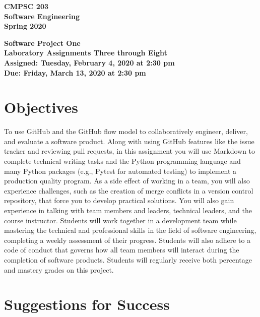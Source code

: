 \documentclass[11pt]{article}
\newcommand{\assignmentduedate}{March 13}
\newcommand{\assignmentassignedate}{February 4}
\newcommand{\assignmentnumber}{One}
\newcommand{\labassignmentnumberstart}{Three}
\newcommand{\labassignmentnumberend}{Eight}
\newcommand{\labyear}{2020}
\newcommand{\labdueday}{Friday}
\newcommand{\labassignday}{Tuesday}
\newcommand{\labtime}{2:30 pm}
\newcommand{\assigneddate}{Assigned: \labassignday, \assignmentassignedate, \labyear{} at \labtime{}}
\newcommand{\duedate}{Due: \labdueday, \assignmentduedate, \labyear{} at \labtime{}}
\newcommand{\labtitle}[1]
{
  \begin{center}
    \begin{center}
      \bf
      CMPSC 203\\Software Engineering\\
      Spring 2020\\
      \medskip
    \end{center}
    \bf
    #1
  \end{center}
}
\begin{document}
\thispagestyle{empty}

\labtitle{Software Project \assignmentnumber{} \\ Laboratory Assignments \labassignmentnumberstart{} through \labassignmentnumberend{} \\ \assigneddate{} \\ \duedate{}}

\section*{Objectives}

To use GitHub and the GitHub flow model to collaboratively engineer, deliver,
and evaluate a software product.
%
Along with using GitHub features like the issue tracker and reviewing pull
requests, in this assignment you will use Markdown to complete technical writing
tasks and the Python programming language and many Python packages (e.g., Pytest
for automated testing) to implement a production quality program.
%
As a side effect of working in a team, you will also experience challenges, such
as the creation of merge conflicts in a version control repository, that force
you to develop practical solutions.
%
You will also gain experience in talking with team members and leaders,
technical leaders, and the course instructor.
%
Students will work together in a development team while mastering the technical
and professional skills in the field of software engineering, completing a
weekly assessment of their progress.
%
Students will also adhere to a code of conduct that governs how all team members
will interact during the completion of software products.
%
Students will regularly receive both percentage and mastery grades on this
project.

\section*{Suggestions for Success}
\end{document}
